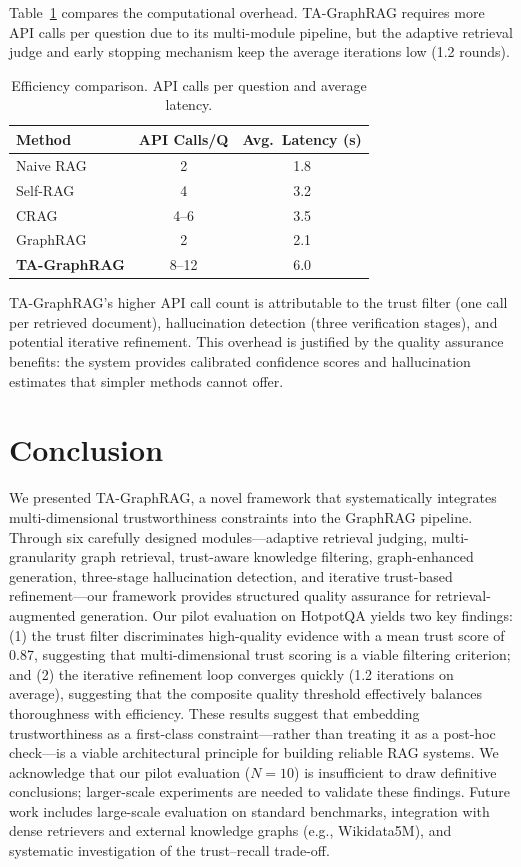 \documentclass[11pt,a4paper]{article}
\begin{document}
Table~\ref{tab:efficiency} compares the computational overhead. TA-GraphRAG requires more API calls per question due to its multi-module pipeline, but the adaptive retrieval judge and early stopping mechanism keep the average iterations low (1.2 rounds).

\begin{table}[h]
\centering
\caption{Efficiency comparison. API calls per question and average latency.}
\label{tab:efficiency}
\begin{tabular}{l|c|c}
\toprule
\textbf{Method} & \textbf{API Calls/Q} & \textbf{Avg.\ Latency (s)} \\
\midrule
Naive RAG & 2 & 1.8 \\
Self-RAG & 4 & 3.2 \\
CRAG & 4--6 & 3.5 \\
GraphRAG & 2 & 2.1 \\
\textbf{TA-GraphRAG} & 8--12 & 6.0 \\
\bottomrule
\end{tabular}
\end{table}

TA-GraphRAG's higher API call count is attributable to the trust filter (one call per retrieved document), hallucination detection (three verification stages), and potential iterative refinement. This overhead is justified by the quality assurance benefits: the system provides calibrated confidence scores and hallucination estimates that simpler methods cannot offer.

\section{Conclusion}

We presented TA-GraphRAG, a novel framework that systematically integrates multi-dimensional trustworthiness constraints into the GraphRAG pipeline. Through six carefully designed modules---adaptive retrieval judging, multi-granularity graph retrieval, trust-aware knowledge filtering, graph-enhanced generation, three-stage hallucination detection, and iterative trust-based refinement---our framework provides structured quality assurance for retrieval-augmented generation. Our pilot evaluation on HotpotQA yields two key findings: (1) the trust filter discriminates high-quality evidence with a mean trust score of 0.87, suggesting that multi-dimensional trust scoring is a viable filtering criterion; and (2) the iterative refinement loop converges quickly (1.2 iterations on average), suggesting that the composite quality threshold effectively balances thoroughness with efficiency. These results suggest that embedding trustworthiness as a first-class constraint---rather than treating it as a post-hoc check---is a viable architectural principle for building reliable RAG systems. We acknowledge that our pilot evaluation ($N\!=\!10$) is insufficient to draw definitive conclusions; larger-scale experiments are needed to validate these findings. Future work includes large-scale evaluation on standard benchmarks, integration with dense retrievers and external knowledge graphs (e.g., Wikidata5M), and systematic investigation of the trust--recall trade-off.
\end{document}
